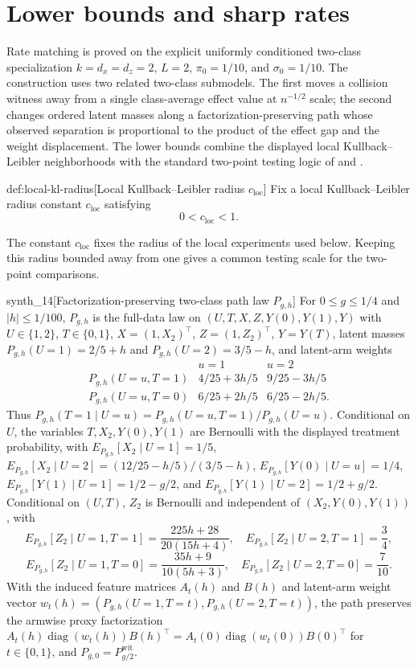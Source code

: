 \documentclass[11pt]{article}
\begin{document}
\section{Lower bounds and sharp rates}

Rate matching is proved on the explicit uniformly conditioned two-class specialization \(k=d_x=d_z=2\), \(L=2\), \(\pi_0=1/10\), and \(\sigma_0=1/10\). The construction uses two related two-class submodels. The first moves a collision witness away from a single class-average effect value at \(n^{-1/2}\) scale; the second changes ordered latent masses along a factorization-preserving path whose observed separation is proportional to the product of the effect gap and the weight displacement. The lower bounds combine the displayed local Kullback--Leibler neighborhoods with the standard two-point testing logic of \citet{LeCam1986} and \citet{PolyanskiyWu2019}.

\begin{definitionv}{def:local-kl-radius}[Local Kullback--Leibler radius \(c_{\mathrm{loc}}\)]
Fix a local Kullback--Leibler radius constant \(c_{\mathrm{loc}}\) satisfying
\[
0<c_{\mathrm{loc}}<1.
\]
\end{definitionv}

The constant \(c_{\mathrm{loc}}\) fixes the radius of the local experiments used below. Keeping this radius bounded away from one gives a common testing scale for the two-point comparisons.

\begin{definitionv}{synth_14}[Factorization-preserving two-class path law $P_{g,h}$]
For $0\le g\le 1/4$ and $|h|\le 1/100$, $P_{g,h}$ is the full-data law on $(U,T,X,Z,Y(0),Y(1),Y)$ with $U\in\{1,2\}$, $T\in\{0,1\}$, $X=(1,X_2)^\top$, $Z=(1,Z_2)^\top$, $Y=Y(T)$, latent masses $P_{g,h}(U=1)=2/5+h$ and $P_{g,h}(U=2)=3/5-h$, and latent-arm weights\[\begin{array}{c|cc} & u=1 & u=2\\ \hline P_{g,h}(U=u,T=1) & 4/25+3h/5 & 9/25-3h/5\\ P_{g,h}(U=u,T=0) & 6/25+2h/5 & 6/25-2h/5 .\end{array}\] Thus $P_{g,h}(T=1\mid U=u)=P_{g,h}(U=u,T=1)/P_{g,h}(U=u)$. Conditional on $U$, the variables $T,X_2,Y(0),Y(1)$ are Bernoulli with the displayed treatment probability, with $E_{P_{g,h}}[X_2\mid U=1]=1/5$, $E_{P_{g,h}}[X_2\mid U=2]=(12/25-h/5)/(3/5-h)$, $E_{P_{g,h}}[Y(0)\mid U=u]=1/4$, $E_{P_{g,h}}[Y(1)\mid U=1]=1/2-g/2$, and $E_{P_{g,h}}[Y(1)\mid U=2]=1/2+g/2$. Conditional on $(U,T)$, $Z_2$ is Bernoulli and independent of $(X_2,Y(0),Y(1))$, with\[E_{P_{g,h}}[Z_2\mid U=1,T=1]=\frac{225h+28}{20(15h+4)},\quad E_{P_{g,h}}[Z_2\mid U=2,T=1]=\frac34,\]\[E_{P_{g,h}}[Z_2\mid U=1,T=0]=\frac{35h+9}{10(5h+3)},\quad E_{P_{g,h}}[Z_2\mid U=2,T=0]=\frac7{10}.\] With the induced feature matrices $A_t(h)$ and $B(h)$ and latent-arm weight vector $w_t(h)=(P_{g,h}(U=1,T=t),P_{g,h}(U=2,T=t))$, the path preserves the armwise proxy factorization $A_t(h)\operatorname{diag}(w_t(h))B(h)^\top=A_t(0)\operatorname{diag}(w_t(0))B(0)^\top$ for $t\in\{0,1\}$, and $P_{g,0}=P^{\mathrm{wit}}_{g/2}$.
\end{definitionv}
\end{document}
